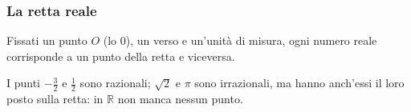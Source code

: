 \documentclass[11pt,a4paper]{article}
\theoremstyle{definition}
\begin{document}
\subsubsection*{La retta reale}

Fissati un punto $O$ (lo $0$), un verso e un'unità di misura, ogni numero
reale corrisponde a un punto della retta e viceversa.

\begin{center}
\end{center}

I punti $-\frac32$ e $\frac12$ sono razionali; $\sqrt{2}$ e $\pi$ sono
irrazionali, ma hanno anch'essi il loro posto sulla retta: in $\mathbb{R}$
non manca nessun punto.
\end{document}
